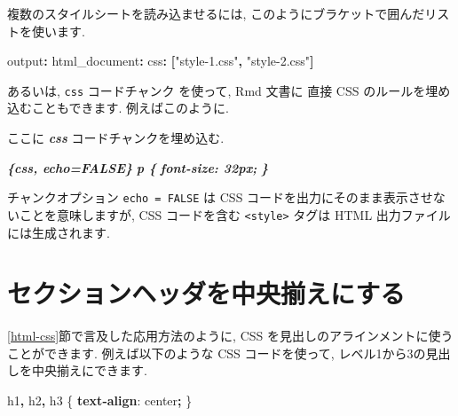 \documentclass[
  11pt,
  lualatex,ja=standard,jafont=noto]{bxjsreport}
\newenvironment{Shaded}{\begin{snugshade}}{\end{snugshade}}
\newcommand{\AttributeTok}[1]{\textcolor[rgb]{0.77,0.63,0.00}{#1}}
\newcommand{\DecValTok}[1]{\textcolor[rgb]{0.00,0.00,0.81}{#1}}
\newcommand{\FunctionTok}[1]{\textcolor[rgb]{0.00,0.00,0.00}{#1}}
\newcommand{\InformationTok}[1]{\textcolor[rgb]{0.56,0.35,0.01}{\textbf{\textit{#1}}}}
\newcommand{\KeywordTok}[1]{\textcolor[rgb]{0.13,0.29,0.53}{\textbf{#1}}}
\newcommand{\NormalTok}[1]{#1}
\newcommand{\OperatorTok}[1]{\textcolor[rgb]{0.81,0.36,0.00}{\textbf{#1}}}
\newcommand{\StringTok}[1]{\textcolor[rgb]{0.31,0.60,0.02}{#1}}
\begin{document}
複数のスタイルシートを読み込ませるには, このようにブラケットで囲んだリストを使います.

\begin{Shaded}
\begin{Highlighting}[]
\FunctionTok{output}\KeywordTok{:}
\AttributeTok{  }\FunctionTok{html\_document}\KeywordTok{:}
\AttributeTok{    }\FunctionTok{css}\KeywordTok{:}\AttributeTok{ }\KeywordTok{[}\StringTok{"style{-}1.css"}\KeywordTok{,}\AttributeTok{ }\StringTok{"style{-}2.css"}\KeywordTok{]}
\end{Highlighting}
\end{Shaded}

あるいは, \texttt{css} コードチャンク を使って, Rmd 文書に 直接 CSS のルールを埋め込むこともできます. 例えばこのように.

\begin{Shaded}
\begin{Highlighting}[]
\NormalTok{ここに }\InformationTok{\textasciigrave{}css\textasciigrave{}}\NormalTok{ コードチャンクを埋め込む.}

\InformationTok{\textasciigrave{}\textasciigrave{}\textasciigrave{}\{css, echo=FALSE\}}
\InformationTok{p \{}
\InformationTok{  font{-}size: 32px;}
\InformationTok{\}}
\InformationTok{\textasciigrave{}\textasciigrave{}\textasciigrave{}}
\end{Highlighting}
\end{Shaded}

チャンクオプション \texttt{echo = FALSE} は CSS コードを出力にそのまま表示させないことを意味しますが, CSS コードを含む \texttt{\textless{}style\textgreater{}} タグは HTML 出力ファイルには生成されます.

\hypertarget{center-heading}{%
\section{セクションヘッダを中央揃えにする}\label{center-heading}}

\ref{html-css}節で言及した応用方法のように, CSS を見出しのアラインメントに使うことができます. 例えば以下のような CSS コードを使って, レベル1から3の見出しを中央揃えにできます.

\begin{Shaded}
\begin{Highlighting}[]
\NormalTok{h1}\OperatorTok{,}\NormalTok{ h2}\OperatorTok{,}\NormalTok{ h3 \{}
  \KeywordTok{text{-}align}\NormalTok{: }\DecValTok{center}\OperatorTok{;}
\NormalTok{\}}
\end{Highlighting}
\end{Shaded}
\end{document}
